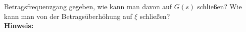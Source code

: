 \begin{question}[section=2,name={Betragsfrequenzgang},difficulty=4,type=mdl,tags={}]
	Betragsfrequenzgang gegeben, wie kann man davon auf $G(s)$ schließen? Wie	kann man von der Betragsüberhöhung auf $\xi$ schließen?
	\\ \textbf{Hinweis:}\\
	
\end{question}
\begin{solution}
	
\end{solution}
